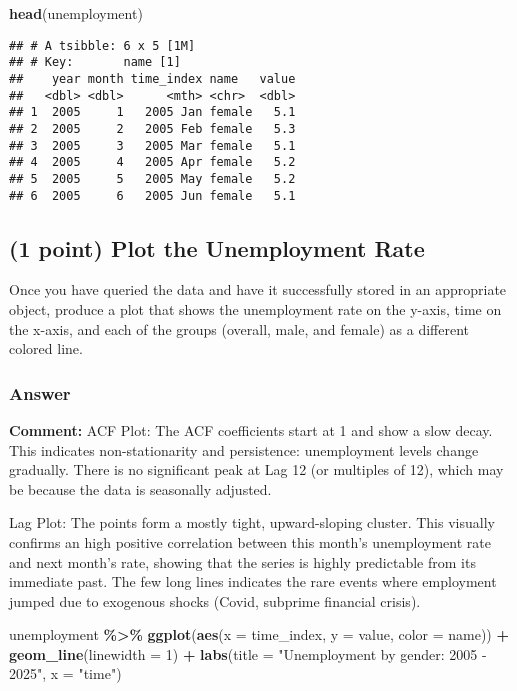\documentclass[
]{article}
\newenvironment{Shaded}{\begin{snugshade}}{\end{snugshade}}
\newcommand{\AttributeTok}[1]{\textcolor[rgb]{0.13,0.29,0.53}{#1}}
\newcommand{\DecValTok}[1]{\textcolor[rgb]{0.00,0.00,0.81}{#1}}
\newcommand{\FunctionTok}[1]{\textcolor[rgb]{0.13,0.29,0.53}{\textbf{#1}}}
\newcommand{\NormalTok}[1]{#1}
\newcommand{\SpecialCharTok}[1]{\textcolor[rgb]{0.81,0.36,0.00}{\textbf{#1}}}
\newcommand{\StringTok}[1]{\textcolor[rgb]{0.31,0.60,0.02}{#1}}
\begin{document}
\begin{Shaded}
\begin{Highlighting}[]
\FunctionTok{head}\NormalTok{(unemployment)}
\end{Highlighting}
\end{Shaded}

\begin{verbatim}
## # A tsibble: 6 x 5 [1M]
## # Key:       name [1]
##    year month time_index name   value
##   <dbl> <dbl>      <mth> <chr>  <dbl>
## 1  2005     1   2005 Jan female   5.1
## 2  2005     2   2005 Feb female   5.3
## 3  2005     3   2005 Mar female   5.1
## 4  2005     4   2005 Apr female   5.2
## 5  2005     5   2005 May female   5.2
## 6  2005     6   2005 Jun female   5.1
\end{verbatim}

\newpage

\subsection{(1 point) Plot the Unemployment
Rate}\label{point-plot-the-unemployment-rate}

Once you have queried the data and have it successfully stored in an
appropriate object, produce a plot that shows the unemployment rate on
the y-axis, time on the x-axis, and each of the groups (overall, male,
and female) as a different colored line.

\subsubsection{Answer}\label{answer-9}

\textbf{Comment:} ACF Plot: The ACF coefficients start at 1 and show a
slow decay. This indicates non-stationarity and persistence:
unemployment levels change gradually. There is no significant peak at
Lag 12 (or multiples of 12), which may be because the data is seasonally
adjusted.

Lag Plot: The points form a mostly tight, upward-sloping cluster. This
visually confirms an high positive correlation between this month's
unemployment rate and next month's rate, showing that the series is
highly predictable from its immediate past. The few long lines indicates
the rare events where employment jumped due to exogenous shocks (Covid,
subprime financial crisis).

\begin{Shaded}
\begin{Highlighting}[]
\NormalTok{unemployment }\SpecialCharTok{\%\textgreater{}\%}
  \FunctionTok{ggplot}\NormalTok{(}\FunctionTok{aes}\NormalTok{(}\AttributeTok{x =}\NormalTok{ time\_index, }\AttributeTok{y =}\NormalTok{ value, }\AttributeTok{color =}\NormalTok{ name)) }\SpecialCharTok{+}
  \FunctionTok{geom\_line}\NormalTok{(}\AttributeTok{linewidth =} \DecValTok{1}\NormalTok{) }\SpecialCharTok{+} 
  \FunctionTok{labs}\NormalTok{(}\AttributeTok{title =} \StringTok{"Unemployment by gender: 2005 {-} 2025"}\NormalTok{,}
       \AttributeTok{x =} \StringTok{"time"}\NormalTok{)}
\end{Highlighting}
\end{Shaded}
\end{document}
